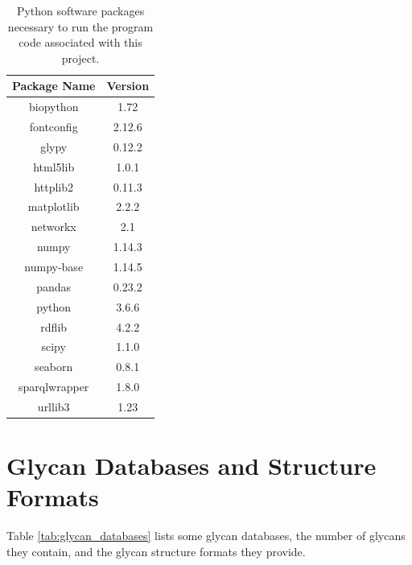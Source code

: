 \documentclass[12pt,a4paper]{article}
\begin{document}
\begin{table}[h]
\centering
\begin{tabular}{|c|c|} \hline
{\bf Package Name} & {\bf Version} \\ \hline
biopython   &               1.72 \\ \hline
fontconfig    &             2.12.6 \\ \hline
glypy       &               0.12.2 \\ \hline
html5lib   &                1.0.1 \\ \hline
httplib2   &                0.11.3 \\ \hline
matplotlib &                2.2.2 \\ \hline
networkx  &                 2.1 \\ \hline
numpy    &                  1.14.3 \\ \hline
numpy-base   &              1.14.5 \\ \hline
pandas  &                   0.23.2 \\ \hline
python   &                  3.6.6 \\ \hline
rdflib  &                   4.2.2 \\ \hline
scipy   &                   1.1.0 \\ \hline
seaborn  &                  0.8.1 \\ \hline
sparqlwrapper   &           1.8.0 \\ \hline
urllib3      &              1.23 \\ \hline
\end{tabular}
\caption{Python software packages necessary to run the program code associated with this project.}
\label{tab:software_dependencies}
\end{table}
\clearpage

\section{Glycan Databases and Structure Formats}
\label{sec:glycan_dbs_and_formats}
Table \ref{tab:glycan_databases} lists some glycan databases, the number of glycans they contain, and the glycan structure formats they provide.
\end{document}
